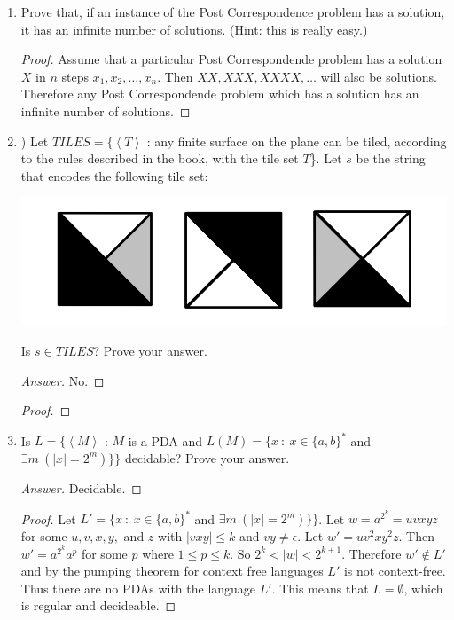 \documentclass[10pt]{article}
\newcommand{\card}[1]{\left| #1 \right|}
\newcommand{\brackets}[1]{\left< #1 \right>}
\begin{document}
\begin{enumerate}[1)]
\item
Prove that, if an instance of the Post Correspondence problem has a solution, it has an infinite number of solutions. (Hint: this is really easy.)
\begin{proof}[Proof]
Assume that a particular Post Correspondende problem has a solution $X$ in $n$ steps $x_1, x_2, \dots , x_n$.  Then $XX, XXX, XXXX, \dots$ will also be solutions.  Therefore any Post Correspondende problem which has a solution has an infinite number of solutions.
\end{proof}

\pagebreak

\item
) Let $TILES = \{\brackets{T}$ : any finite surface on the plane can be tiled, according to the rules described in the book, with the tile set $T$\}.  Let $s$ be the string that encodes the following tile set:\\

\begin{center}
\includegraphics[scale=.2]{images/tiles.png}
\end{center}
Is $s \in TILES$?  Prove your answer.
\begin{proof}[Answer]
No.
\end{proof}
\begin{proof}[Proof]
\end{proof}


\item
Is $L = \{\brackets{M}$ : $M$ is a PDA and $L(M) = \{x\ :\ x \in \{a, b\}^*$ and $\exists m\ (\card{x} = 2^m)\}\}$ decidable?  Prove your answer.
\begin{proof}[Answer]
Decidable.
\end{proof}
\begin{proof}[Proof]
Let $L' = \{x\ :\ x \in \{a, b\}^*$ and $\exists m\ (\card{x} = 2^m)\}\}$.  Let $w = a^{2^k} = uvxyz$ for some $u, v, x, y,$ and $z$ with $\card{vxy} \leq k$ and $vy \neq \epsilon$.  Let $w' = uv^2xy^2z$.  Then $w' = a^{2^k}a^p$ for some $p$ where $1 \leq p \leq k$.  So $2^k < \card{w} < 2^{k+1}$.  Therefore $w' \not \in L'$ and by the pumping theorem for context free languages $L'$ is not context-free.  Thus there are no PDAs with the language $L'$.  This means that $L = \emptyset$, which is regular and decideable.
\end{proof}


\end{enumerate}
\end{document}
